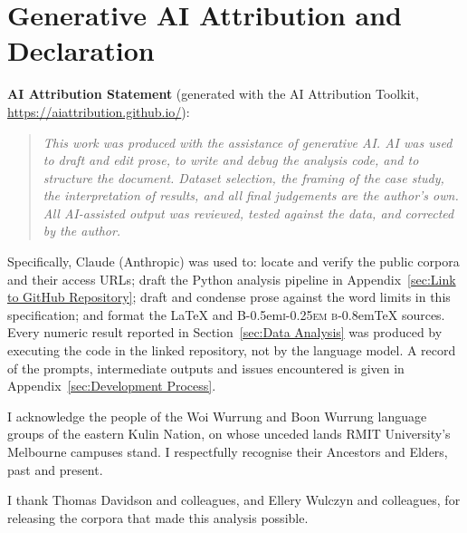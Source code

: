 \documentclass[manuscript,screen,review,nonacm]{acmart}
\providecommand\BibTeX{{%
    \normalfont B\kern-0.5em{\scshape i\kern-0.25em b}\kern-0.8em\TeX}}}
\begin{document}
\section*{Generative AI Attribution and Declaration}

\noindent\textbf{AI Attribution Statement} (generated with the AI Attribution Toolkit,
\url{https://aiattribution.github.io/}):

\begin{quote}
\emph{This work was produced with the assistance of generative AI. AI was used to draft
and edit prose, to write and debug the analysis code, and to structure the document.
Dataset selection, the framing of the case study, the interpretation of results, and all
final judgements are the author's own. All AI-assisted output was reviewed, tested against
the data, and corrected by the author.}
\end{quote}

\noindent Specifically, Claude (Anthropic) was used to: locate and verify the public
corpora and their access URLs; draft the Python analysis pipeline in
Appendix~\ref{sec:Link to GitHub Repository}; draft and condense prose against the word
limits in this specification; and format the \LaTeX{} and \BibTeX{} sources. Every numeric
result reported in Section~\ref{sec:Data Analysis} was produced by executing the code in
the linked repository, not by the language model. A record of the prompts, intermediate
outputs and issues encountered is given in Appendix~\ref{sec:Development Process}.

\begin{acks}
I acknowledge the people of the Woi Wurrung and Boon Wurrung language groups of the
eastern Kulin Nation, on whose unceded lands RMIT University's Melbourne campuses stand. I
respectfully recognise their Ancestors and Elders, past and present.

I thank Thomas Davidson and colleagues, and Ellery Wulczyn and colleagues, for releasing
the corpora that made this analysis possible.
\end{acks}




\appendix

\end{document}
